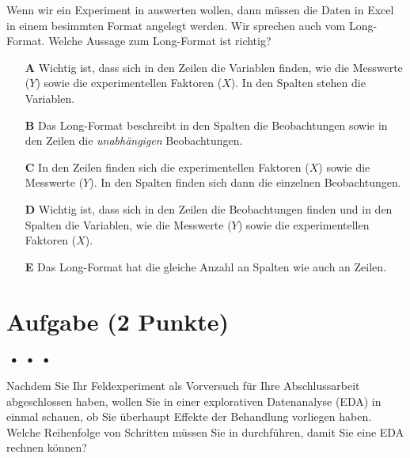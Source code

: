 \documentclass[a4paper, 9pt]{scrartcl}\usepackage[]{graphicx}\usepackage[]{xcolor}
\begin{document}
Wenn wir ein Experiment in \Rlogo auswerten wollen, dann müssen die Daten in Excel in einem besimmten Format angelegt werden. Wir sprechen auch vom Long-Format. Welche Aussage zum Long-Format ist richtig?



\begin{enumerate}
\item [\textbf{A} \msquare] Wichtig ist, dass sich in den Zeilen die Variablen finden, wie die Messwerte ($Y$) sowie die experimentellen Faktoren ($X$). In den Spalten stehen die Variablen.
\item [\textbf{B} \msquare] Das Long-Format beschreibt in den Spalten die Beobachtungen sowie in den Zeilen die \textit{unabhängigen} Beobachtungen.
\item [\textbf{C} \msquare] In den Zeilen finden sich die experimentellen Faktoren ($X$) sowie die Messwerte ($Y$). In den Spalten finden sich dann die einzelnen Beobachtungen.
\item [\textbf{D} \msquare] Wichtig ist, dass sich in den Zeilen die Beobachtungen finden und in den Spalten die Variablen, wie die Messwerte ($Y$) sowie die experimentellen Faktoren ($X$).
\item [\textbf{E} \msquare] Das Long-Format hat die gleiche Anzahl an Spalten wie auch an Zeilen.
\end{enumerate} 

\section{Aufgabe \hfill (2 Punkte)}

\ifcollection
\begin{flushright}
\tiny\vspace{-2Ex}
\textbf{\examinhaltstart}
\exammodulemathstat $\;\bullet$
\exammodulestat $\;\bullet$
\exammodulestatversuch $\;\bullet$
\exammodulebiostat
\vspace{-1Ex}
\end{flushright}
\fi



Nachdem Sie Ihr Feldexperiment als Vorversuch für Ihre Abschlussarbeit abgeschlossen haben, wollen Sie in einer explorativen Datenanalyse (EDA) in \Rlogo einmal schauen, ob Sie überhaupt Effekte der Behandlung vorliegen haben. Welche Reihenfolge von Schritten müssen Sie in \Rlogo durchführen, damit Sie eine EDA rechnen können?
\end{document}
